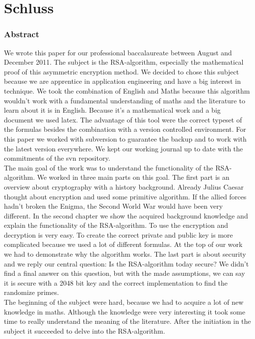 \part{Schluss}
\section{Abstract}
We wrote this paper for our professional baccalaureate between August and December 2011. The subject is the RSA-algorithm, especially the mathematical proof of this asymmetric encryption method. We decided to chose this subject because we are apprentice in application engineering and have a big interest in technique. We took the combination of English and Maths because this algorithm wouldn't work with a fundamental understanding of maths and the literature to learn about it is in English. Because it's a mathematical work and a big document we used latex. The advantage of this tool were the correct typeset of the formulas besides the combination with a version controlled environment. For this paper we worked with subversion to guarantee the backup and to work with the latest version everywhere. We kept our working journal up to date with the commitments of the svn repository.  \\
The main goal of the work was to understand the functionality of the RSA-algorithm. We worked in three main parts on this goal. The first part is an overview about cryptography with a history background. Already Julius Caesar thought about encryption and used some primitive algorithm. If the allied forces hadn't broken the Enigma, the Second World War would have been very different. %
In the second chapter we show the acquired background knowledge and explain the functionality of the RSA-algorithm. To use the encryption and decryption is very easy. To create the correct private and public key is more complicated because we used a lot of different formulas. At the top of our work we had to demonstrate why the algorithm works. 
The last part is about security and we reply our central question: Is the RSA-algorithm today secure? We didn't find a final answer on this question, but with the made assumptions, %
we can say it is secure with a 2048 bit key and the correct implementation to find the randomize primes. \\
The beginning of the subject were hard, because we had to acquire a lot of new knowledge in maths. Although the knowledge were very interesting it took some time to really understand the meaning of the literature. After the initiation in the subject it succeeded to delve into the RSA-algorithm. %
